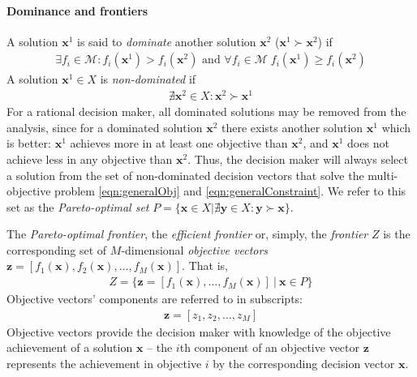 \paragraph{Dominance and frontiers}
A solution $\mathbf{x}^1$ is said to \textit{dominate} another solution $\mathbf{x}^2$ ($\mathbf{x}^1 \succ \mathbf{x}^2$) if
\begin{align}
\exists f_i \in \mathcal{M} : f_i(\mathbf{x}^1) > f_i(\mathbf{x}^2) \text{ and } \forall f_i \in \mathcal{M} \; f_i(\mathbf{x}^1) \ge f_i(\mathbf{x}^2)
\end{align}
A solution $\mathbf{x}^1 \in X$ is \textit{non-dominated} if
\begin{align}
\nexists \mathbf{x}^2 \in X : \mathbf{x}^2 \succ \mathbf{x}^1
\end{align}
For a rational decision maker, all dominated solutions may be removed from the analysis, since for a dominated solution $\mathbf{x}^2$ there exists another solution $\mathbf{x}^1$ which is better: $\mathbf{x}^1$ achieves more in at least one objective than $\mathbf{x}^2$, and $\mathbf{x}^1$ does not achieve less in any objective than $\mathbf{x}^2$. Thus, the decision maker will always select a solution from the set of non-dominated decision vectors that solve the multi-objective problem \eqref{eqn:generalObj} and \eqref{eqn:generalConstraint}. We refer to this set as the \textit{Pareto-optimal set} $P = \{\mathbf{x} \in X | \nexists \mathbf{y} \in X : \mathbf{y} \succ \mathbf{x} \}$.

The \textit{Pareto-optimal frontier}, the \textit{efficient frontier} or, simply, the \textit{frontier} $Z$ is the corresponding set of $M$-dimensional \textit{objective vectors} $\mathbf{z} = [f_1(\mathbf{x}),f_2(\mathbf{x}),\ldots,f_M(\mathbf{x})]$. That is,
\begin{align}
Z = \{\mathbf{z} = [f_1(\mathbf{x}),\ldots,f_M(\mathbf{x})] \:|\: \mathbf{x} \in P\}
\end{align}
Objective vectors' components are referred to in subscripts:
\begin{align}
\mathbf{z} = [z_1, z_2, \ldots, z_M]
\end{align}
Objective vectors provide the decision maker with knowledge of the objective achievement of a solution $\mathbf{x}$ -- the $i$th component of an objective vector $\mathbf{z}$ represents the achievement in objective $i$ by the corresponding decision vector $\mathbf{x}$.

